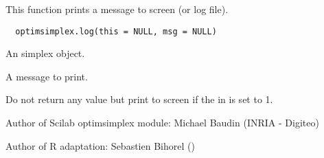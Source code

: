 %
\begin{Description}\relax
This function prints a message to screen (or log file).
\end{Description}
%
\begin{Usage}
\begin{verbatim}
  optimsimplex.log(this = NULL, msg = NULL)
\end{verbatim}
\end{Usage}
%
\begin{Arguments}
\begin{ldescription}
\item[\code{this}] An simplex object.
\item[\code{msg}] A message to print.
\end{ldescription}
\end{Arguments}
%
\begin{Value}
Do not return any value but print  to screen if the 
in  is set to 1.
\end{Value}
%
\begin{Author}\relax
Author of Scilab optimsimplex module: Michael Baudin (INRIA - Digiteo)

Author of R adaptation: Sebastien Bihorel ()
\end{Author}
%
\begin{SeeAlso}\relax
{}
\end{SeeAlso}
